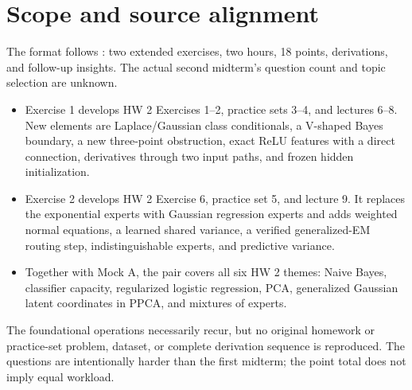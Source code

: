 \documentclass[11pt,a4paper]{article}
\begin{document}
\section*{Scope and source alignment}
The format follows : two extended
exercises, two hours, 18 points, derivations, and follow-up insights. The
actual second midterm's question count and topic selection are unknown.
\begin{itemize}
  \item Exercise 1 develops HW 2 Exercises 1--2, practice sets 3--4, and lectures 6--8. New elements are Laplace/Gaussian class conditionals, a V-shaped Bayes boundary, a new three-point obstruction, exact ReLU features with a direct connection, derivatives through two input paths, and frozen hidden initialization.
  \item Exercise 2 develops HW 2 Exercise 6, practice set 5, and lecture 9. It replaces the exponential experts with Gaussian regression experts and adds weighted normal equations, a learned shared variance, a verified generalized-EM routing step, indistinguishable experts, and predictive variance.
  \item Together with Mock A, the pair covers all six HW 2 themes: Naive Bayes, classifier capacity, regularized logistic regression, PCA, generalized Gaussian latent coordinates in PPCA, and mixtures of experts.
\end{itemize}
The foundational operations necessarily recur, but no original homework or
practice-set problem, dataset, or complete derivation sequence is reproduced.
The questions are intentionally harder than the first midterm; the point total
does not imply equal workload.
\end{document}
